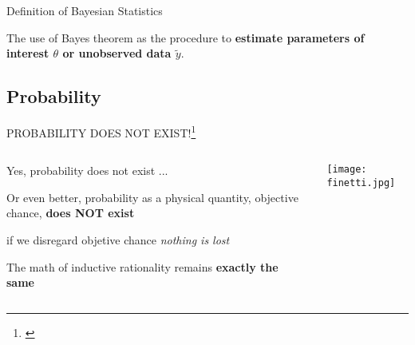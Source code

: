 \begin{frame}{Definition of Bayesian Statistics}
	\begin{defn}
		The use of Bayes theorem as the procedure to \textbf{estimate
			parameters of interest $\theta$ or unobserved data $\tilde{y}$}.
		\parencite{gelman2013bayesian}
	\end{defn}
\end{frame}

\subsection{Probability}
\begin{frame}{PROBABILITY DOES NOT EXIST!\footnote{\textcite{definettiTheoryProbability1974}}}
	\begin{columns}
		\begin{column}{0.8\textwidth}
			\begin{vfilleditems}
				\item Yes, probability does not exist ...
				\item Or even better, probability as a physical quantity,
				objective chance, \textbf{does NOT exist}
				\item if we disregard objetive chance \textit{nothing is lost}
				\item The math of inductive rationality remains
				\textbf{exactly the same}
			\end{vfilleditems}
		\end{column}
		\begin{column}{0.2\textwidth}
			\centering
			\texttt{[image: finetti.jpg]}
		\end{column}
	\end{columns}
\end{frame}

